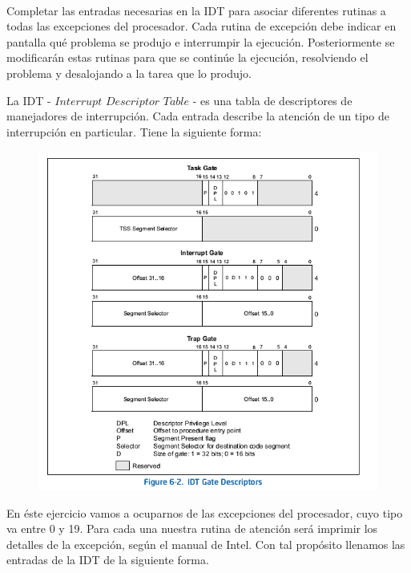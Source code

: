 \paragraph{}\label{subsubsec:ej2-a}
Completar las entradas necesarias en la IDT para asociar diferentes rutinas a
todas las excepciones del procesador. Cada rutina de excepción debe indicar en
pantalla qué problema se produjo e interrumpir la ejecución. Posteriormente se
modificarán estas rutinas para que se continúe la ejecución, resolviendo el
problema y desalojando a la tarea que lo produjo.
\hruler
{}

La IDT - $Interrupt$ $Descriptor$ $Table$ - es una tabla de descriptores de manejadores de interrupción. Cada entrada describe la atención de
un tipo de interrupción en particular. Tiene la siguiente forma:

\begin{figure}[H]
\begin{center}
\includegraphics[]{imagenes/idt_entry.png}
\end{center}
\end{figure}


En éste ejercicio vamos a ocuparnos de las excepciones del procesador, cuyo tipo va entre 0 y 19.
Para cada una nuestra rutina de atención será imprimir los detalles de la excepción, según el manual de Intel. 
Con tal propósito llenamos las entradas de la IDT de la siguiente forma.


